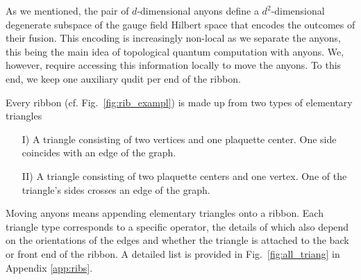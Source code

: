 \documentclass[two column]{article}
\begin{document}



As we mentioned, the pair of $d$-dimensional anyons define a $d^2$-dimensional degenerate subspace of the gauge field Hilbert space that encodes the outcomes of their fusion. This encoding is increasingly non-local as we separate the anyons, this being the main idea of topological quantum computation with anyons. We, however, require accessing this information locally to move the anyons. To this end, we keep one auxiliary qudit per end of the ribbon.

Every ribbon (cf. Fig.~\ref{fig:rib_exampl}) is made up from two types of elementary triangles
\begin{itemize}
    \item[I)] A triangle consisting of two vertices and one plaquette center. One side coincides with an edge of the graph.
        \item[II)] A triangle consisting of two plaquette centers and one vertex. One of the triangle's sides crosses an edge of the graph.
\end{itemize}
Moving anyons means appending elementary triangles onto a ribbon. Each triangle type corresponds to a specific operator, the details of which also depend on the orientations of the edges and whether the triangle is attached to the back or front end of the ribbon. A detailed list is provided in Fig.~\ref{fig:all_triang} in Appendix \ref{app:ribs}.
\end{document}
